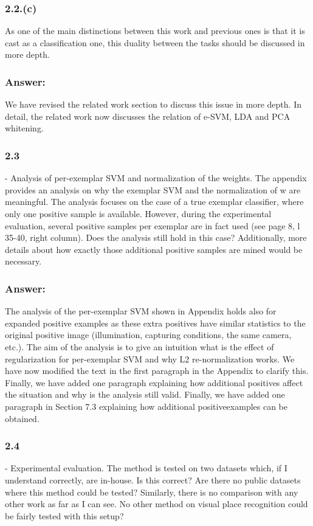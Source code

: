 \documentclass[a4paper,12pt]{article}
\begin{document}
\subsubsection*{2.2.(c)}
As one of the main distinctions between this work and previous ones is that it is cast as a classification one, this duality between the tasks should be discussed in more depth.

\subsubsection*{Answer:}
We have revised the related work section to discuss this issue in more depth. In detail, the related work now discusses the relation of e-SVM, LDA and PCA whitening.

\subsubsection*{2.3}
- Analysis of per-exemplar SVM and normalization of the weights. The appendix provides an analysis on why the exemplar SVM and the normalization of w are meaningful. The analysis focuses on the case of a true exemplar classifier, where only one positive sample is available. However, during the experimental evaluation, several positive samples per exemplar are in fact used (see page 8, l 35-40, right column). Does the analysis still hold in this case? Additionally, more details about how exactly those additional positive samples are mined would be necessary.

\subsubsection*{Answer:}
The analysis of the per-exemplar SVM shown in Appendix holds also for expanded positive examples as these extra positives have similar statistics to the original positive image (illumination, capturing conditions, the same camera, etc.). The aim of the analysis is to give an intuition what is the effect of regularization for per-exemplar SVM and why L2 re-normalization works. We have now modified the text in the first paragraph in the Appendix to clarify this. Finally, we have added one paragraph explaining how additional positives affect the situation and why is the analysis still valid.
Finally, we have added one paragraph in Section 7.3 explaining how additional positiveexamples can be obtained.
\subsubsection*{2.4}
- Experimental evaluation. The method is tested on two datasets which, if I understand correctly, are in-house. Is this correct? Are there no public datasets where this method could be tested? Similarly, there is no comparison with any other work as far as I can see. No other method on visual place recognition could be fairly tested with this setup?
\end{document}
